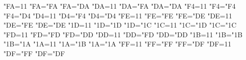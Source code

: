 {    \catcode"FA=11 \lccode"FA="FA \uccode"FA="DA %
    \catcode"DA=11 \lccode"DA="FA \uccode"DA="DA %
    \catcode"F4=11 \lccode"F4="F4 \uccode"F4="D4 %
    \catcode"D4=11 \lccode"D4="F4 \uccode"D4="D4 %
    \catcode"FE=11 \lccode"FE="FE \uccode"FE="DE %
    \catcode"DE=11 \lccode"DE="FE \uccode"DE="DE %
    \catcode"1D=11 \lccode"1D="1D \uccode"1D="1C %
    \catcode"1C=11 \lccode"1C="1D \uccode"1C="1C %
    \catcode"FD=11 \lccode"FD="FD \uccode"FD="DD %
    \catcode"DD=11 \lccode"DD="FD \uccode"DD="DD %
    \catcode"1B=11 \lccode"1B="1B \uccode"1B="1A %
    \catcode"1A=11 \lccode"1A="1B \uccode"1A="1A %
    \catcode"FF=11 \lccode"FF="FF \uccode"FF="DF %
    \catcode"DF=11 \lccode"DF="FF \uccode"DF="DF %
}

